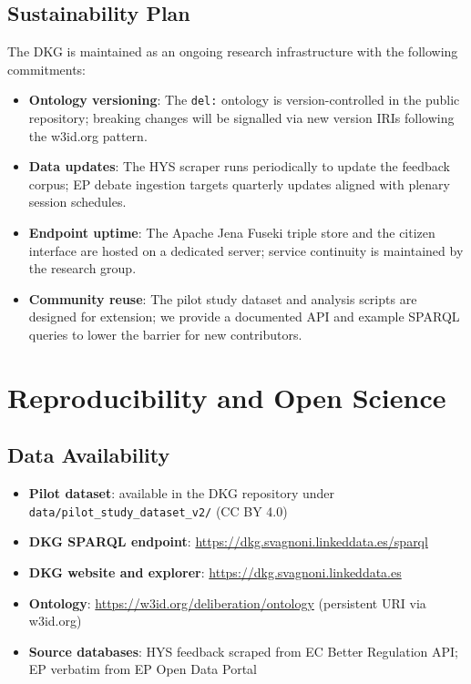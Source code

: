 \documentclass[sigconf,natbib]{acmart}
\begin{document}
\subsection{Sustainability Plan}
The DKG is maintained as an ongoing research infrastructure with the following commitments:
\begin{itemize}
  \item \textbf{Ontology versioning}: The \texttt{del:} ontology is version-controlled in the public repository; breaking changes will be signalled via new version IRIs following the w3id.org pattern.
  \item \textbf{Data updates}: The HYS scraper runs periodically to update the feedback corpus; EP debate ingestion targets quarterly updates aligned with plenary session schedules.
  \item \textbf{Endpoint uptime}: The Apache Jena Fuseki triple store and the citizen interface are hosted on a dedicated server; service continuity is maintained by the research group.
  \item \textbf{Community reuse}: The pilot study dataset and analysis scripts are designed for extension; we provide a documented API and example SPARQL queries to lower the barrier for new contributors.
\end{itemize}

\section{Reproducibility and Open Science}

\subsection{Data Availability}
\begin{itemize}
  \item \textbf{Pilot dataset}: available in the DKG repository under \texttt{data/pilot\_study\_dataset\_v2/} (CC BY 4.0)
  \item \textbf{DKG SPARQL endpoint}: \url{https://dkg.svagnoni.linkeddata.es/sparql}
  \item \textbf{DKG website and explorer}: \url{https://dkg.svagnoni.linkeddata.es}
  \item \textbf{Ontology}: \url{https://w3id.org/deliberation/ontology} (persistent URI via w3id.org)
  \item \textbf{Source databases}: HYS feedback scraped from EC Better Regulation API; EP verbatim from EP Open Data Portal
\end{itemize}
\end{document}

